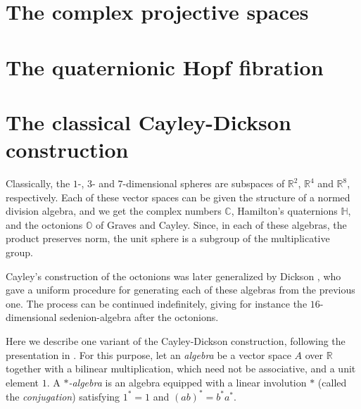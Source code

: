 \section{The complex projective spaces}

\section{The quaternionic Hopf fibration}
\section{The classical Cayley-Dickson construction}
\label{sec:cayley-dickson}

Classically, the $1$-, $3$- and $7$-dimensional spheres are subspaces of
$\mathbb{R}^2$, $\mathbb{R}^4$ and $\mathbb{R}^8$, respectively. Each
of these vector spaces can be given the structure of a normed division
algebra, and we get the complex numbers $\mathbb{C}$, Hamilton's
quaternions $\mathbb{H}$, and the octonions $\mathbb{O}$ of Graves and
Cayley. Since, in each of these algebras, the product preserves norm,
the unit sphere is a subgroup of the multiplicative group.

Cayley's construction of the octonions was later generalized by
Dickson \cite{Dickson1919}, who gave a uniform procedure for
generating each of these algebras from the previous one. The process
can be continued indefinitely, giving for instance the $16$-dimensional
sedenion-algebra after the octonions.

Here we describe one variant of the Cayley-Dickson construction,
following the presentation in \cite{Baez2002}. For this purpose, let
an \emph{algebra} be a vector space $A$ over $\mathbb R$ together with
a bilinear multiplication, which need not be associative, and a unit
element $1$. A \emph{$*$-algebra} is an algebra equipped with a linear involution
$*$ (called the \emph{conjugation}) satisfying $1^*=1$ and $(ab)^*=b^*a^*$.

